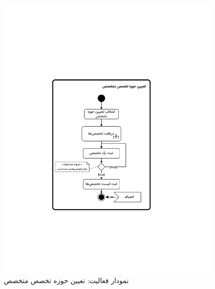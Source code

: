 \begin{figure}
	\centering
	\includegraphics[scale=0.8, page=1]{figs/OOD-activity21-30.pdf}
	\caption{نمودار فعالیت: تعیین حوزه تخصص متخصص}
\end{figure}
\FloatBarrier
\newpage

